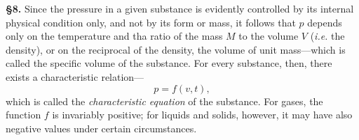 \documentclass[oneside,12pt]{book}
\begin{document}
\textbf{\S 8.} Since the pressure in a given substance is evidently controlled by its internal physical condition only, and not by its form or mass, it follows that $p$ depends only on the temperature and tha ratio of the mass $M$ to the volume $V$ (\textit{i.e.} the density), or on the reciprocal of the density, the volume of unit mass---which is called the specific volume of the substance. For every substance, then, there exists a characteristic relation---
$$p=f(v,t),$$
which is called the \textit{characteristic equation} of the substance. For gases, the function $f$ is invariably positive; for liquids and solids, however, it may have also negative values under certain circumstances. \par 
\end{document}
